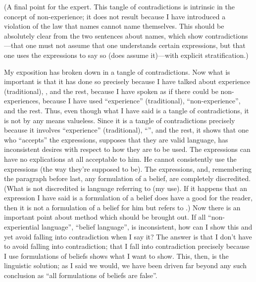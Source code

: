 (A final point for the expert. This 
tangle of contradictions is intrinsic in the concept of non-experience; it does 
not result because I have introduced a violation of the law that names cannot 
name themselves. This should be absolutely clear from the two sentences 
about names, which show contradictions---that one must not assume that 
one understands certain expressions, but that one uses the expressions to say 
so (does assume it)---with explicit stratification.) 

My exposition has broken down in a tangle of contradictions. Now 
what is important is that it has done so precisely because I have talked about 
experience (traditional), , and the rest, because I have spoken 
as if there could be non-experiences, because I have used \enquote{experience} 
(traditional), \enquote{non-experience}, and the rest. Thus, even though what I have 
said is a tangle of contradictions, it is not by any means valueless. Since it is 
a tangle of contradictions precisely because it involves \enquote{experience} 
(traditional), \enquote{}, and the rest, it shows that one who \enquote{accepts} 
the expressions, supposes that they are valid language, has inconsistent 
desires with respect to how they are to be used. The expressions can have no 
explications at all acceptable to him. He cannot consistently use the 
expressions (the way they're supposed to be). The expressions, and, 
remembering the paragraph before last, any formulation of a belief, are 
completely discredited. (What is not discredited is language referring to 
 (my use). If it happens that an expression I have said is a 
formulation of a belief does have a good  for the reader, then it is 
not a formulation of a belief for him but refers to .) Now there is 
an important point about method which should be brought out. If all 
\enquote{non-experiential language}, \enquote{belief language}, is inconsistent, how can I 
show this and yet avoid falling into contradiction when I say it? The answer 
is that I don't have to avoid falling into contradiction; that I fall into 
contradiction precisely because I use formulations of beliefs shows what I 
want to show. This, then, is the linguistic solution; as I said we would, we 
have been driven far beyond any such conclusion as \enquote{all formulations of 
beliefs are false}. 

